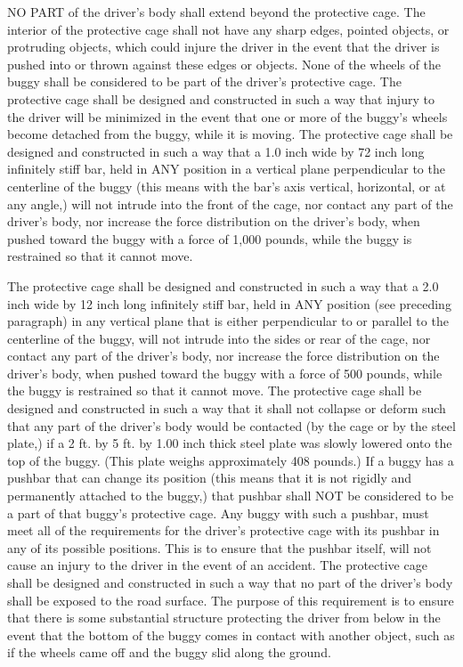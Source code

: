 	NO PART of the driver's body shall extend beyond the protective cage.
	The interior of the protective cage shall not have any sharp edges, pointed objects, or protruding objects, which could injure the driver in the event that the driver is pushed into or thrown against these edges or objects.
	None of the wheels of the buggy shall be considered to be part of the driver's protective cage.
	The protective cage shall be designed and constructed in such a way that injury to the driver will be minimized in the event that one or more of the buggy's wheels become detached from the buggy, while it is moving.
	The protective cage shall be designed and constructed in such a way that a 1.0 inch wide by 72 inch long infinitely stiff bar, held in ANY position in a vertical plane perpendicular to the centerline of the buggy (this means with the bar's axis vertical, horizontal, or at any angle,) will not intrude into the front of the cage, nor contact any part of the driver's body, nor increase the force distribution on the driver's body, when pushed toward the buggy with a force of 1,000 pounds, while the buggy is restrained so that it cannot move.

	The protective cage shall be designed and constructed in such a way that a 2.0 inch wide by 12 inch long infinitely stiff bar, held in ANY position (see preceding paragraph) in any vertical plane that is either perpendicular to or parallel to the centerline of the buggy, will not intrude into the sides or rear of the cage, nor contact any part of the driver's body, nor increase the force distribution on the driver's body, when pushed toward the buggy with a force of 500 pounds, while the buggy is restrained so that it cannot move.
	The protective cage shall be designed and constructed in such a way that it shall not collapse or deform such that any part of the driver's body would be contacted (by the cage or by the steel plate,) if a 2 ft. by 5 ft. by 1.00 inch thick steel plate was slowly lowered onto the top of the buggy. (This plate weighs approximately 408 pounds.)
	If a buggy has a pushbar that can change its position (this means that it is not rigidly and permanently attached to the buggy,) that pushbar shall NOT be considered to be a part of that buggy's protective cage.
	Any buggy with such a pushbar, must meet all of the requirements for the driver's protective cage with its pushbar in any of its possible positions. This is to ensure that the pushbar itself, will not cause an injury to the driver in the event of an accident.
	The protective cage shall be designed and constructed in such a way that no part of the driver's body shall be exposed to the road surface. The purpose of this requirement is to ensure that there is some substantial structure protecting the driver from below in the event that the bottom of the buggy comes in contact with another object, such as if the wheels came off and the buggy slid along the ground.

